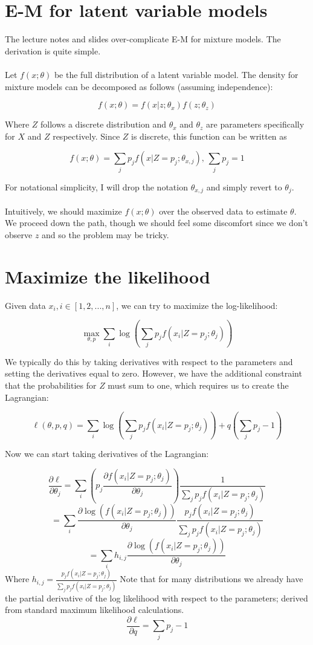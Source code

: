 \documentclass{article}
\begin{document}
\section{E-M for latent variable models}

The lecture notes and slides over-complicate E-M for mixture models.  The derivation is quite simple.
\\
\\

Let \(f(x; \theta)\) be the full distribution of a latent variable model.  The density for mixture models can be decomposed as follows (assuming independence):

\[f(x; \theta)=f(x|z; \theta_x)f(z; \theta_z )\] 

Where \(Z\) follows a discrete distribution and \(\theta_x\) and \(\theta_z\) are parameters specifically for \(X\) and \(Z\) respectively.  Since \(Z\) is discrete, this function can be written as 

\[f(x; \theta)=\sum_j p_j f(x|Z=p_j; \theta_{x, j}),\,\sum_j p_j =1\]

For notational simplicity, I will drop the notation \(\theta_{x, j}\) and simply revert to \(\theta_j\).
\\
\\
Intuitively, we should maximize \(f(x; \theta)\) over the observed data to estimate \(\theta\).  We proceed down the path, though we should feel some discomfort since we don't observe \(z\) and so the problem may be tricky.

\section{Maximize the likelihood}

Given data \(x_i, i\in [1, 2, ..., n]\), we can try to maximize the log-likelihood:

\[\max_{\theta, p} \sum_i \log\left(\sum_j p_j f(x_i|Z=p_j; \theta_j)\right)\]
 
We typically do this by taking derivatives with respect to the parameters and setting the derivatives equal to zero.  However, we have the additional constraint that the probabilities for \(Z\) must sum to one, which requires us to create the Lagrangian:

\[\ell(\theta, p, q)=\sum_i \log\left(\sum_j p_j f(x_i|Z=p_j; \theta_j)\right)+q\left(\sum_j p_j-1\right)\]

Now we can start taking derivatives of the Lagrangian:

\[\frac{\partial \ell}{\partial \theta_j}=\sum_i \left(p_j \frac{\partial f(x_i|Z=p_j; \theta_j)}{\partial \theta_j} \right) \frac{1}{\sum_j p_j f(x_i|Z=p_j; \theta_j)} \]
\[=\sum_i \frac{\partial \log\left(f(x_i|Z=p_j; \theta_j)\right)}{\partial \theta_j} \frac{p_jf(x_i|Z=p_j; \theta_j)} {\sum_j p_j f(x_i|Z=p_j; \theta_j)}\]
\[=\sum_i h_{i,j} \frac{\partial \log\left(f(x_i|Z=p_j; \theta_j)\right)}{\partial \theta_j}\]
Where \(h_{i,j}=\frac{p_jf(x_i|Z=p_j; \theta_j)} {\sum_j p_j f(x_i|Z=p_j; \theta_j)}\)
Note that for many distributions we already have the partial derivative of the log likelihood with respect to the parameters; derived from standard maximum likelihood calculations.
\[\frac{\partial \ell}{\partial q}=\sum_j p_j-1\]
\end{document}
